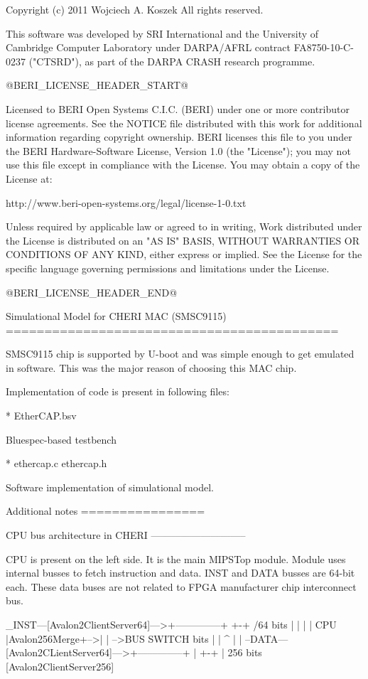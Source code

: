 Copyright (c) 2011 Wojciech A. Koszek
All rights reserved.

This software was developed by SRI International and the University of
Cambridge Computer Laboratory under DARPA/AFRL contract FA8750-10-C-0237
("CTSRD"), as part of the DARPA CRASH research programme.

@BERI_LICENSE_HEADER_START@

Licensed to BERI Open Systems C.I.C. (BERI) under one or more contributor
license agreements.  See the NOTICE file distributed with this work for
additional information regarding copyright ownership.  BERI licenses this
file to you under the BERI Hardware-Software License, Version 1.0 (the
"License"); you may not use this file except in compliance with the
License.  You may obtain a copy of the License at:

  http://www.beri-open-systems.org/legal/license-1-0.txt

Unless required by applicable law or agreed to in writing, Work distributed
under the License is distributed on an "AS IS" BASIS, WITHOUT WARRANTIES OR
CONDITIONS OF ANY KIND, either express or implied.  See the License for the
specific language governing permissions and limitations under the License.

@BERI_LICENSE_HEADER_END@

Simulational Model for CHERI MAC (SMSC9115)
===========================================

SMSC9115 chip is supported by U-boot and was simple enough to get emulated
in software. This was the major reason of choosing this MAC chip.

Implementation of code is present in following files:

* EtherCAP.bsv

  Bluespec-based testbench

* ethercap.c
  ethercap.h

  Software implementation of simulational model.


Additional notes
================


CPU bus architecture in CHERI
-----------------------------

CPU is present on the left side.
It is the main MIPSTop module.
Module uses internal busses to fetch instruction and data.
INST and DATA busses are 64-bit each.
These data buses are not related to FPGA manufacturer chip interconnect bus.


      _INST---[Avalon2ClientServer64]--->+--------------+   +-+   
    /64 bits                             |              |   | |  
CPU                                      |Avalon256Merge+-->| | -->BUS SWITCH
     bits                             |              | ^ | |
     --DATA---[Avalon2CLientServer64]--->+--------------+ | +-+   
                                                          |
                                                      256 bits       
                                             [Avalon2ClientServer256]
                                                                     
